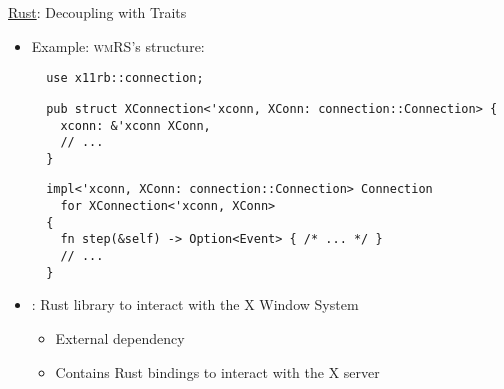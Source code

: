 \begin{frame}[fragile]{\underline{Rust}: Decoupling with Traits \hfill {\footnotesize \currentname}}


    \begin{itemize}

        \item Example: \textsc{wmRS}'s  structure:\\
\begin{verbatim}
  use x11rb::connection;
\end{verbatim}
\begin{verbatim}
  pub struct XConnection<'xconn, XConn: connection::Connection> {
    xconn: &'xconn XConn,
    // ...
  }
\end{verbatim}
\begin{verbatim}
  impl<'xconn, XConn: connection::Connection> Connection
    for XConnection<'xconn, XConn>
  {
    fn step(&self) -> Option<Event> { /* ... */ }
    // ...
  }
\end{verbatim}

        \item {}: Rust library to interact with the X Window System\\
            \begin{itemize}
                \item External dependency
                \item Contains Rust bindings to interact with the X server
            \end{itemize}

    \end{itemize}

    \vfill

\end{frame}

